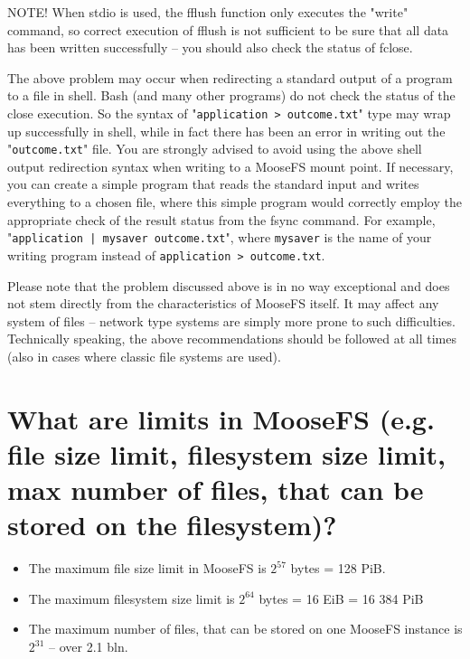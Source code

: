 \documentclass[a4paper,11pt,english]{report}
\def\code#1{\texttt{#1}}
\begin{document}
		NOTE! When stdio is used, the fflush function only executes the "write" command, so correct execution of fflush is not sufficient to be sure that all data has been written successfully -- you should also check the status of fclose. 
		
		The above problem may occur when redirecting a standard output of a program to a file in shell. Bash (and many other programs) do not check the status of the close execution. So the syntax of "\code{application > outcome.txt}" type may wrap up successfully in shell, while in fact there has been an error in writing out the "\code{outcome.txt}" file. You are strongly advised to avoid using the above shell output redirection syntax when writing to a MooseFS mount point. If necessary, you can create a simple program that reads the standard input and writes everything to a chosen file, where this simple program would correctly employ the appropriate check of the result status from the fsync command. For example,  "\code{application | mysaver outcome.txt}", where \code{mysaver} is the name of your writing program instead of \code{application > outcome.txt}.
		
		Please note that the problem discussed above is in no way exceptional and does not stem directly from the characteristics of MooseFS itself. It may affect any system of files -- network type systems are simply more prone to such difficulties. Technically speaking, the above recommendations should be followed at all times (also in cases where classic file systems are used).


		\section{What are limits in MooseFS (e.g. file size limit, filesystem size limit, max number of files, that can be stored on the filesystem)?}
		
		\begin{itemize}
			\item The maximum file size limit in MooseFS is $2^{57}$ bytes = 128 PiB.
			\item The maximum filesystem size limit is $2^{64}$ bytes = 16 EiB = 16 384 PiB
			\item The maximum number of files, that can be stored on one MooseFS instance is $2^{31}$ -- over 2.1 bln.
		\end{itemize}
				 
\end{document}

